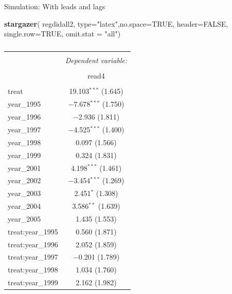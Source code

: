 \documentclass[
  ignorenonframetext,
]{beamer}
\newenvironment{Shaded}{\begin{snugshade}}{\end{snugshade}}
\newcommand{\AttributeTok}[1]{\textcolor[rgb]{0.13,0.29,0.53}{#1}}
\newcommand{\ConstantTok}[1]{\textcolor[rgb]{0.56,0.35,0.01}{#1}}
\newcommand{\FunctionTok}[1]{\textcolor[rgb]{0.13,0.29,0.53}{\textbf{#1}}}
\newcommand{\NormalTok}[1]{#1}
\newcommand{\StringTok}[1]{\textcolor[rgb]{0.31,0.60,0.02}{#1}}
\begin{document}
\begin{frame}[fragile]{Simulation: With leads and lags}
\protect\hypertarget{simulation-with-leads-and-lags-3}{}
\tiny

\begin{Shaded}
\begin{Highlighting}[]
\FunctionTok{stargazer}\NormalTok{( regdidall2, }\AttributeTok{type=}\StringTok{"latex"}\NormalTok{,}\AttributeTok{no.space=}\ConstantTok{TRUE}\NormalTok{, }\AttributeTok{header=}\ConstantTok{FALSE}\NormalTok{, }\AttributeTok{single.row=}\ConstantTok{TRUE}\NormalTok{, }\AttributeTok{omit.stat =} \StringTok{"all"}\NormalTok{)}
\end{Highlighting}
\end{Shaded}

\begin{table}[!htbp] \centering 
  \caption{} 
  \label{} 
\begin{tabular}{@{\extracolsep{5pt}}lc} 
\\[-1.8ex]\hline 
\hline \\[-1.8ex] 
 & \multicolumn{1}{c}{\textit{Dependent variable:}} \\ 
\cline{2-2} 
\\[-1.8ex] & read4 \\ 
\hline \\[-1.8ex] 
 treat & 19.103$^{***}$ (1.645) \\ 
  year\_1995 & $-$7.678$^{***}$ (1.750) \\ 
  year\_1996 & $-$2.936 (1.811) \\ 
  year\_1997 & $-$4.525$^{***}$ (1.400) \\ 
  year\_1998 & 0.097 (1.566) \\ 
  year\_1999 & 0.324 (1.831) \\ 
  year\_2001 & 4.198$^{***}$ (1.461) \\ 
  year\_2002 & $-$3.454$^{***}$ (1.269) \\ 
  year\_2003 & 2.451$^{*}$ (1.308) \\ 
  year\_2004 & 3.586$^{**}$ (1.639) \\ 
  year\_2005 & 1.435 (1.553) \\ 
  treat:year\_1995 & 0.560 (1.871) \\ 
  treat:year\_1996 & 2.052 (1.859) \\ 
  treat:year\_1997 & $-$0.201 (1.789) \\ 
  treat:year\_1998 & 1.034 (1.760) \\ 
  treat:year\_1999 & 2.162 (1.982) \\ 

\end{tabular}
\end{table}
\end{frame}
\end{document}
